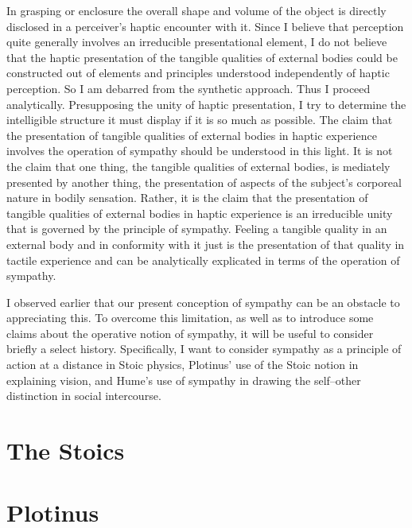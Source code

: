 In grasping or enclosure the overall shape and volume of the object is directly disclosed in a perceiver's haptic encounter with it. Since I believe that perception quite generally involves an irreducible presentational element, I do not believe that the haptic presentation of the tangible qualities of external bodies could be constructed out of elements and principles understood independently of haptic perception. So I am debarred from the synthetic approach. Thus I proceed analytically. Presupposing the unity of haptic presentation, I try to determine the intelligible structure it must display if it is so much as possible. The claim that the presentation of tangible qualities of external bodies in haptic experience involves the operation of sympathy should be understood in this light. It is not the claim that one thing, the tangible qualities of external bodies, is mediately presented by another thing, the presentation of aspects of the subject's corporeal nature in bodily sensation. Rather, it is the claim that the presentation of tangible qualities of external bodies in haptic experience is an irreducible unity that is governed by the principle of sympathy. Feeling a tangible quality in an external body and in conformity with it just is the presentation of that quality in tactile experience and can be analytically explicated in terms of the operation of sympathy.

I observed earlier that our present conception of sympathy can be an obstacle to appreciating this. To overcome this limitation, as well as to introduce some claims about the operative notion of sympathy, it will be useful to consider briefly a select history. Specifically, I want to consider sympathy as a principle of action at a distance in Stoic physics, Plotinus' use of the Stoic notion in explaining vision, and Hume's use of sympathy in drawing the self--other distinction in social intercourse. 


\section{The Stoics} %
\label{sec:the_stoics}


\section{Plotinus} %
\label{sec:plotinus}

